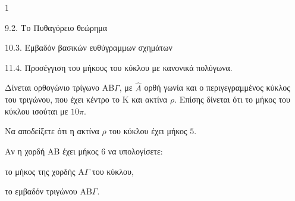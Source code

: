 \begin{ylh}{1}
    \item 9.2. Το Πυθαγόρειο θεώρημα
    \item 10.3. Εμβαδόν βασικών ευθύγραμμων σχημάτων
    \item 11.4. Προσέγγιση του μήκους του κύκλου με κανονικά πολύγωνα.
\end{ylh}
\begin{figure}
\end{figure}
Δίνεται ορθογώνιο τρίγωνο AB$\Gamma$, με $\hat{A}$ ορθή γωνία και ο περιγεγραμμένος κύκλος του τριγώνου, που έχει κέντρο το K και ακτίνα $\rho$. Επίσης δίνεται ότι το μήκος του κύκλου ισούται με $10\pi$.
\begin{alist}
\item Να αποδείξετε ότι η ακτίνα $\rho$ του κύκλου έχει μήκος $5$. 
\item Αν η χορδή AB έχει μήκος $6$ να υπολογίσετε:
    \begin{rlist}
    \item το μήκος της χορδής A$\Gamma$ του κύκλου, 
    \item το εμβαδόν τριγώνου AB$\Gamma$. 
    \end{rlist}
\end{alist}